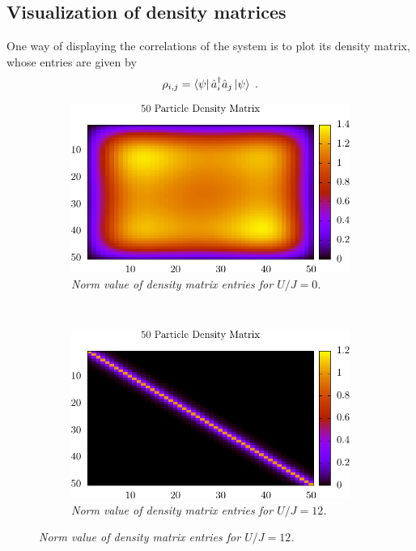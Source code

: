 \subsection{Visualization of density matrices}
One way of displaying the correlations of the system is to plot its density matrix, whose entries are given by
\begin{equation}
	\rho_{i,j} = \bra{\psi} \hat{a}_{i}^{\dag} \hat{a}_j \ket{\psi} \; .
\end{equation}
\begin{figure}[h!]
    \centering
    \begin{subfigure}[t]{0.49\textwidth}
        \includegraphics[width=\textwidth]{Figures/DensityMatSF20sweeps.pdf}
        \caption{\textit{Norm value of density matrix entries for $U/J = 0$.}}
        \label{fig:DensityMatSF}
    \end{subfigure}
    ~
    \begin{subfigure}[t]{0.49\textwidth}
        \includegraphics[width=\textwidth]{Figures/DensityMatMI.pdf}
        \caption{\textit{Norm value of density matrix entries for $U/J = 12$.}}
        \label{fig:DensityMatMI}
    \end{subfigure}    
\end{figure}
